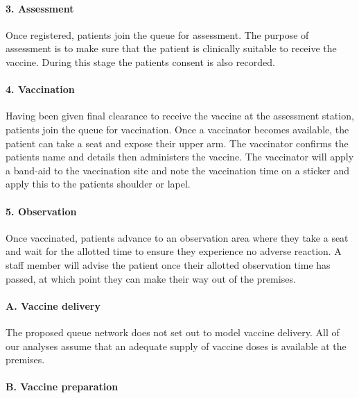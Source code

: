 \documentclass{article}
\begin{document}
\hypertarget{assessment}{%
\paragraph{3. Assessment}\label{assessment}}

Once registered, patients join the queue for assessment. The purpose of
assessment is to make sure that the patient is clinically suitable to
receive the vaccine. During this stage the patients consent is also
recorded.

\hypertarget{vaccination}{%
\paragraph{4. Vaccination}\label{vaccination}}

Having been given final clearance to receive the vaccine at the
assessment station, patients join the queue for vaccination. Once a
vaccinator becomes available, the patient can take a seat and expose
their upper arm. The vaccinator confirms the patients name and details
then administers the vaccine. The vaccinator will apply a band-aid to
the vaccination site and note the vaccination time on a sticker and
apply this to the patients shoulder or lapel.

\hypertarget{observation}{%
\paragraph{5. Observation}\label{observation}}

Once vaccinated, patients advance to an observation area where they take
a seat and wait for the allotted time to ensure they experience no
adverse reaction. A staff member will advise the patient once their
allotted observation time has passed, at which point they can make their
way out of the premises.

\hypertarget{a.-vaccine-delivery}{%
\paragraph{A. Vaccine delivery}\label{a.-vaccine-delivery}}

The proposed queue network does not set out to model vaccine delivery.
All of our analyses assume that an adequate supply of vaccine doses is
available at the premises.

\hypertarget{b.-vaccine-preparation}{%
\paragraph{B. Vaccine preparation}\label{b.-vaccine-preparation}}
\end{document}
